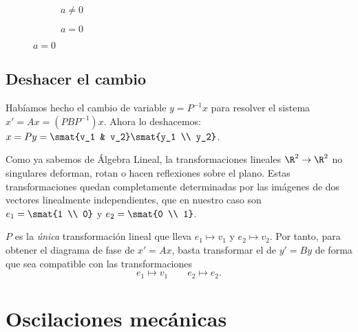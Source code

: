 \documentclass[../main.tex]{subfiles}
\begin{document}
\begin{figure}[ht]
  \centering
  \begin{subfigure}{0.5\textwidth}
    \centering
    \caption*{\(a \neq 0\)}
  \end{subfigure}%
  \begin{subfigure}{0.5\textwidth}
    \centering
    \caption*{\(a = 0\)}
  \end{subfigure}
\end{figure}


\subsection{Deshacer el cambio}
Habíamos hecho el cambio de variable \(y = P^{-1}x\) para resolver el sistema
\(x' = Ax = (PBP^{-1})x\). Ahora lo deshacemos: \(x = Py = \smat{v_1 & v_2}
\smat{y_1 \\ y_2}\).

Como ya sabemos de Álgebra Lineal, la transformaciones lineales
\(\R^2 \to \R^2\) no singulares deforman, rotan o hacen reflexiones sobre el
plano. Estas transformaciones quedan completamente determinadas por las imágenes de
dos vectores linealmente independientes, que en nuestro caso son \(e_1 = \smat{1
  \\ 0}\) y \(e_2 = \smat{0 \\ 1}\).

\(P\) es la \emph{única} transformación lineal que lleva \(e_1 \mapsto v_1\) y
\(e_2 \mapsto v_2\). Por tanto, para obtener el diagrama de fase de \(x' = Ax\),
basta transformar el de \(y' = By\) de forma que sea compatible con las
transformaciones
\[e_1 \mapsto v_1 \qquad e_2 \mapsto e_2.\]

\section{Oscilaciones mecánicas}
\end{document}
